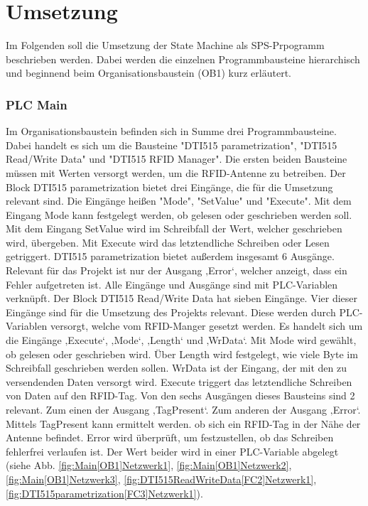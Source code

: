 \chapter*{Umsetzung}
\label{cha:Umsetzung}
Im Folgenden soll die Umsetzung der State Machine als SPS-Prpogramm beschrieben werden. Dabei werden die einzelnen Programmbausteine hierarchisch und beginnend beim Organisationsbaustein (OB1) kurz erläutert.

\subsection*{PLC Main}
\label{subsec:PLC_Main}
Im Organisationsbaustein befinden sich in Summe drei Programmbausteine. Dabei handelt es sich um die Bausteine "DTI515 parametrization", "DTI515 Read/Write Data" und "DTI515 RFID Manager". Die ersten beiden Bausteine müssen mit Werten versorgt werden, um die RFID-Antenne zu betreiben.
Der Block DTI515 parametrization bietet drei Eingänge, die für die Umsetzung relevant sind. Die Eingänge heißen "Mode", "SetValue" und "Execute". Mit dem Eingang Mode kann festgelegt werden, ob gelesen oder geschrieben werden soll. Mit dem Eingang SetValue wird im Schreibfall der Wert, welcher geschrieben wird, übergeben. Mit Execute wird das letztendliche Schreiben oder Lesen getriggert. DTI515 parametrization bietet außerdem insgesamt 6 Ausgänge. Relevant für das Projekt ist nur der Ausgang ‚Error‘, welcher anzeigt, dass ein Fehler aufgetreten ist. Alle Eingänge und Ausgänge sind mit PLC-Variablen verknüpft.
Der Block DTI515 Read/Write Data hat sieben Eingänge. Vier dieser Eingänge sind für die Umsetzung des Projekts relevant. Diese werden durch PLC-Variablen versorgt, welche vom RFID-Manger gesetzt werden. Es handelt sich um die Eingänge ‚Execute‘, ‚Mode‘, ‚Length‘ und ‚WrData‘. Mit Mode wird gewählt, ob gelesen oder geschrieben wird. Über Length wird festgelegt, wie viele Byte im Schreibfall geschrieben werden sollen. WrData ist der Eingang, der mit den zu versendenden Daten versorgt wird. Execute triggert das letztendliche Schreiben von Daten auf den RFID-Tag. Von den sechs Ausgängen dieses Bausteins sind 2 relevant. Zum einen der Ausgang ‚TagPresent‘. Zum anderen der Ausgang ‚Error‘. Mittels TagPresent kann ermittelt werden. ob sich ein RFID-Tag in der Nähe der Antenne befindet. Error wird überprüft, um festzustellen, ob das Schreiben fehlerfrei verlaufen ist. Der Wert beider wird in einer PLC-Variable abgelegt (siehe Abb. \ref{fig:Main[OB1]Netzwerk1}, \ref{fig:Main[OB1]Netzwerk2}, \ref{fig:Main[OB1]Netzwerk3}, \ref{fig:DTI515ReadWriteData[FC2]Netzwerk1}, \ref{fig:DTI515parametrization[FC3]Netzwerk1}).

